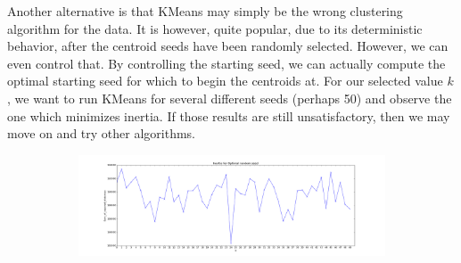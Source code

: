 \documentclass[20pt]{article} %
\begin{document}
Another alternative is that KMeans may simply be the wrong clustering algorithm for the data.  It is however, quite popular, due to its deterministic behavior, after the centroid seeds have been randomly selected.  However, we can even control that.  By controlling the starting seed, we can actually compute the optimal starting seed for which to begin the centroids at.  For our selected value $k$, we want to run KMeans for several different seeds (perhaps 50) and observe the one which minimizes inertia.  If those results are still unsatisfactory, then we may move on and try other algorithms.  
\begin{figure}[!htbp]
  	\centering
   	\begin{subfigure}[p]{0.95\linewidth}
    	\includegraphics[width=\linewidth]{./figures/best_newseed.png}
   	\end{subfigure}
\end{figure}
\end{document}
